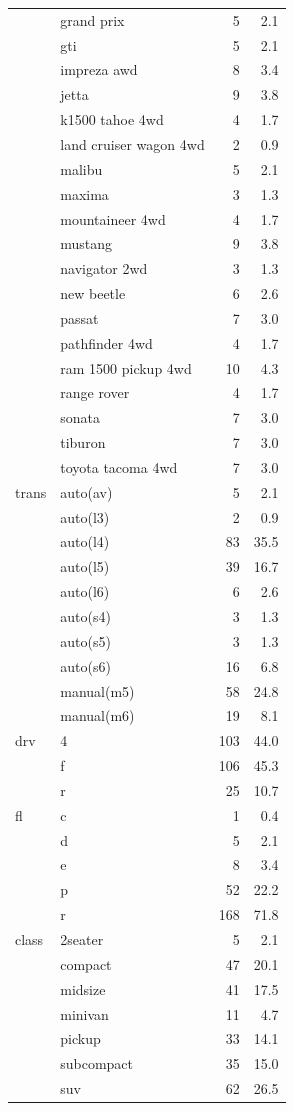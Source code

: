 \documentclass[
  letterpaper,
  DIV=11,
  numbers=noendperiod]{scrreprt}
\begin{document}
\begin{table}
\begin{tabular}[t]{llrr}
 & grand prix & 5 & \num{2.1}\\
 & gti & 5 & \num{2.1}\\
 & impreza awd & 8 & \num{3.4}\\
 & jetta & 9 & \num{3.8}\\
 & k1500 tahoe 4wd & 4 & \num{1.7}\\
 & land cruiser wagon 4wd & 2 & \num{0.9}\\
 & malibu & 5 & \num{2.1}\\
 & maxima & 3 & \num{1.3}\\
 & mountaineer 4wd & 4 & \num{1.7}\\
 & mustang & 9 & \num{3.8}\\
 & navigator 2wd & 3 & \num{1.3}\\
 & new beetle & 6 & \num{2.6}\\
 & passat & 7 & \num{3.0}\\
 & pathfinder 4wd & 4 & \num{1.7}\\
 & ram 1500 pickup 4wd & 10 & \num{4.3}\\
 & range rover & 4 & \num{1.7}\\
 & sonata & 7 & \num{3.0}\\
 & tiburon & 7 & \num{3.0}\\
 & toyota tacoma 4wd & 7 & \num{3.0}\\
trans & auto(av) & 5 & \num{2.1}\\
 & auto(l3) & 2 & \num{0.9}\\
 & auto(l4) & 83 & \num{35.5}\\
 & auto(l5) & 39 & \num{16.7}\\
 & auto(l6) & 6 & \num{2.6}\\
 & auto(s4) & 3 & \num{1.3}\\
 & auto(s5) & 3 & \num{1.3}\\
 & auto(s6) & 16 & \num{6.8}\\
 & manual(m5) & 58 & \num{24.8}\\
 & manual(m6) & 19 & \num{8.1}\\
drv & 4 & 103 & \num{44.0}\\
 & f & 106 & \num{45.3}\\
 & r & 25 & \num{10.7}\\
fl & c & 1 & \num{0.4}\\
 & d & 5 & \num{2.1}\\
 & e & 8 & \num{3.4}\\
 & p & 52 & \num{22.2}\\
 & r & 168 & \num{71.8}\\
class & 2seater & 5 & \num{2.1}\\
 & compact & 47 & \num{20.1}\\
 & midsize & 41 & \num{17.5}\\
 & minivan & 11 & \num{4.7}\\
 & pickup & 33 & \num{14.1}\\
 & subcompact & 35 & \num{15.0}\\
 & suv & 62 & \num{26.5}\\
\bottomrule
\end{tabular}
\end{table}
\end{document}
